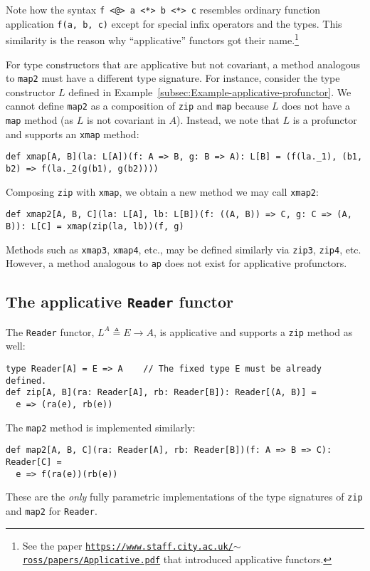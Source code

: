 Note how the syntax \lstinline!f <@> a <*> b <*> c! resembles ordinary
function application \lstinline!f(a, b, c)! except for special infix
operators and the types. This similarity is the reason why \textsf{``}applicative\textsf{''}
functors got their name.\footnote{See the paper \texttt{\href{https://www.staff.city.ac.uk/~ross/papers/Applicative.pdf}{https://www.staff.city.ac.uk/$\sim$ross/papers/Applicative.pdf}}
that introduced applicative functors.}

For type constructors that are applicative but not covariant, a method
analogous to \lstinline!map2! must have a different type signature.
For instance, consider the type constructor $L$ defined in Example~\ref{subsec:Example-applicative-profunctor}.
We cannot define \lstinline!map2! as a composition of \lstinline!zip!
and \lstinline!map! because $L$ does not have a \lstinline!map!
method (as $L$ is not covariant in $A$). Instead, we note that $L$
is a profunctor and supports an \lstinline!xmap!
method:
\begin{lstlisting}
def xmap[A, B](la: L[A])(f: A => B, g: B => A): L[B] = (f(la._1), (b1, b2) => f(la._2(g(b1), g(b2))))
\end{lstlisting}
Composing \lstinline!zip! with \lstinline!xmap!, we obtain a new
method we may call \lstinline!xmap2!:
\begin{lstlisting}
def xmap2[A, B, C](la: L[A], lb: L[B])(f: ((A, B)) => C, g: C => (A, B)): L[C] = xmap(zip(la, lb))(f, g)
\end{lstlisting}
Methods such as \lstinline!xmap3!, \lstinline!xmap4!, etc., may
be defined similarly via \lstinline!zip3!, \lstinline!zip4!, etc.
However, a method analogous to \lstinline!ap! does not exist for
applicative profunctors.

\subsection{The applicative \texttt{Reader} functor\label{subsec:The-applicative-Reader-functor}}

The \lstinline!Reader! functor, $L^{A}\triangleq E\rightarrow A$,
is applicative and supports a \lstinline!zip! method as well:
\begin{lstlisting}
type Reader[A] = E => A    // The fixed type E must be already defined.
def zip[A, B](ra: Reader[A], rb: Reader[B]): Reader[(A, B)] =
  e => (ra(e), rb(e))
\end{lstlisting}
The \lstinline!map2! method is implemented similarly:
\begin{lstlisting}
def map2[A, B, C](ra: Reader[A], rb: Reader[B])(f: A => B => C): Reader[C] =
  e => f(ra(e))(rb(e))
\end{lstlisting}
These are the \emph{only} fully parametric implementations of the
type signatures of \lstinline!zip! and \lstinline!map2! for \lstinline!Reader!.


